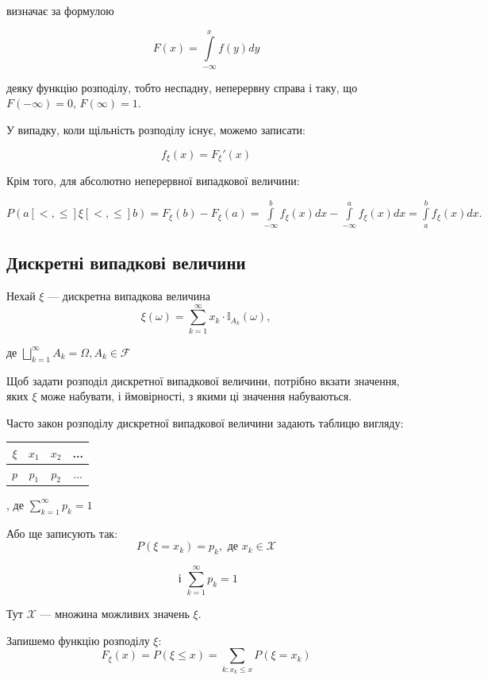 визначає за формулою

$$F(x) = \int\limits_{-\infty}^{x} f(y) dy $$

деяку функцію розподілу, тобто неспадну, неперервну справа і
таку, що $F(-\infty) = 0$, $F(\infty) = 1$.

У випадку, коли щільність розподілу існує,
можемо записати:

\begin{equation}
    \label{density_function_with_distribution_function}
    f_{\xi}(x) = F_{\xi}'(x)
\end{equation}

Крім того, для абсолютно неперервної випадкової величини:

$P(a [<, \leqslant] \xi [<, \leqslant] b)
= F_{\xi}(b) - F_{\xi}(a)
= \int\limits_{-\infty}^{b} f_{\xi}(x) dx - \int\limits_{-\infty}^{a} f_{\xi}(x) dx
= \int\limits_{a}^{b} f_{\xi}(x) dx.$

\subsection{Дискретні випадкові величини}

Нехай $\xi$ --- дискретна випадкова величина
$$\xi(\omega)
= \sum\limits_{k=1}^{\infty} x_k \cdot \mathbb{I}_{A_k}(\omega),$$

де $\bigsqcup\limits_{k=1}^{\infty} A_k = \Omega, A_k \in \mathcal{F}$

Щоб задати розподіл дискретної випадкової
величини, потрібно вкзати значення, яких $\xi$
може набувати, і ймовірності, з якими ці значення набуваються.

Часто закон розподілу дискретної випадкової величини задають
таблицю вигляду:

\begin{center}
    \begin{tabular}{c|c|c|c}
        $\xi$ & $x_1$ & $x_2$ & ... \\
        \hline $p$   & $p_1$ & $p_2$ & ... \\
    \end{tabular}
    , де $\sum\limits_{k=1}^{\infty} p_k = 1$
\end{center}

Або ще записують так:
$$P(\xi = x_k) = p_k, \text{ де } x_k \in \mathcal{X}$$

$$\text{ і } \sum\limits_{k=1}^{\infty} p_k = 1$$

Тут $\mathcal{X}$ --- множина можливих значень $\xi$.

Запишемо функцію розподілу $\xi$:
$$F_{\xi}(x)
= P(\xi \leqslant x)
= \sum\limits_{k: x_k \leqslant x} P(\xi = x_k)$$

